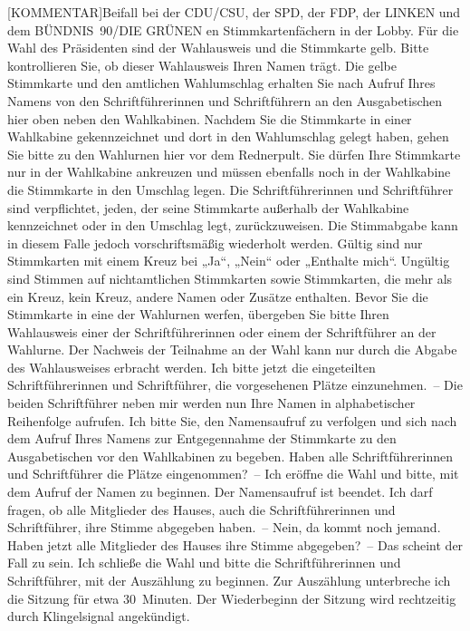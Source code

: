 \documentclass[a4paper,11pt]{article}
\begin{document}
[KOMMENTAR]Beifall bei der CDU/CSU, der SPD, der FDP, der LINKEN und dem BÜNDNIS 90/DIE GRÜNEN
en Stimmkartenfächern in der Lobby. Für die Wahl des Präsidenten sind der Wahlausweis und die Stimmkarte gelb. Bitte kontrollieren Sie, ob dieser Wahlausweis Ihren Namen trägt. Die gelbe Stimmkarte und den amtlichen Wahlumschlag erhalten Sie nach Aufruf Ihres Namens von den Schriftführerinnen und Schriftführern an den Ausgabetischen hier oben neben den Wahlkabinen. Nachdem Sie die Stimmkarte in einer Wahlkabine gekennzeichnet und dort in den Wahlumschlag gelegt haben, gehen Sie bitte zu den Wahlurnen hier vor dem Rednerpult. Sie dürfen Ihre Stimmkarte nur in der Wahlkabine ankreuzen und müssen ebenfalls noch in der Wahlkabine die Stimmkarte in den Umschlag legen. Die Schriftführerinnen und Schriftführer sind verpflichtet, jeden, der seine Stimmkarte außerhalb der Wahlkabine kennzeichnet oder in den Umschlag legt, zurückzuweisen. Die Stimmabgabe kann in diesem Falle jedoch vorschriftsmäßig wiederholt werden. Gültig sind nur Stimmkarten mit einem Kreuz bei „Ja“, „Nein“ oder „Enthalte mich“. Ungültig sind Stimmen auf nichtamtlichen Stimmkarten sowie Stimmkarten, die mehr als ein Kreuz, kein Kreuz, andere Namen oder Zusätze enthalten. Bevor Sie die Stimmkarte in eine der Wahlurnen werfen, übergeben Sie bitte Ihren Wahlausweis einer der Schriftführerinnen oder einem der Schriftführer an der Wahlurne. Der Nachweis der Teilnahme an der Wahl kann nur durch die Abgabe des Wahlausweises erbracht werden. Ich bitte jetzt die eingeteilten Schriftführerinnen und Schriftführer, die vorgesehenen Plätze einzunehmen. – Die beiden Schriftführer neben mir werden nun Ihre Namen in alphabetischer Reihenfolge aufrufen. Ich bitte Sie, den Namensaufruf zu verfolgen und sich nach dem Aufruf Ihres Namens zur Entgegennahme der Stimmkarte zu den Ausgabetischen vor den Wahlkabinen zu begeben. Haben alle Schriftführerinnen und Schriftführer die Plätze eingenommen? – Ich eröffne die Wahl und bitte, mit dem Aufruf der Namen zu beginnen. Der Namensaufruf ist beendet. Ich darf fragen, ob alle Mitglieder des Hauses, auch die Schriftführerinnen und Schriftführer, ihre Stimme abgegeben haben. – Nein, da kommt noch jemand. Haben jetzt alle Mitglieder des Hauses ihre Stimme abgegeben? – Das scheint der Fall zu sein. Ich schließe die Wahl und bitte die Schriftführerinnen und Schriftführer, mit der Auszählung zu beginnen. Zur Auszählung unterbreche ich die Sitzung für etwa 30 Minuten. Der Wiederbeginn der Sitzung wird rechtzeitig durch Klingelsignal angekündigt.
\end{document}
